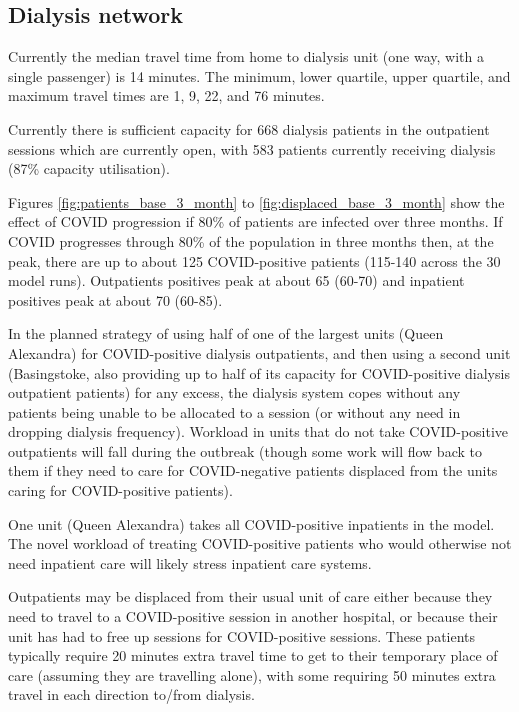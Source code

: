\begin{multicols}{2}
\subsection{Dialysis network}

Currently the median travel time from home to dialysis unit (one way, with a single passenger) is 14 minutes. The minimum, lower quartile, upper quartile, and maximum travel times are 1, 9, 22, and 76 minutes.

Currently there is sufficient capacity for 668 dialysis patients in the outpatient sessions which are currently open, with 583 patients currently receiving dialysis (87\% capacity utilisation).

Figures \ref{fig:patients_base_3_month} to \ref{fig:displaced_base_3_month} show the effect of COVID progression if 80\% of patients are infected over three months. If COVID progresses through 80\% of the population in three months then, at the peak, there are up to about 125 COVID-positive patients (115-140 across the 30 model runs). Outpatients positives peak at about 65 (60-70) and inpatient positives peak at about 70 (60-85).

In the planned strategy of using half of one of the largest units (Queen Alexandra) for COVID-positive dialysis outpatients, and then using a second unit (Basingstoke, also providing up to half of its capacity for COVID-positive dialysis outpatient patients) for any excess, the dialysis system copes without any patients being unable to be allocated to a session (or without any need in dropping dialysis frequency). Workload in units that do not take COVID-positive outpatients will fall during the outbreak (though some work will flow back to them if they need to care for COVID-negative patients displaced from the units caring for COVID-positive patients). 

One unit (Queen Alexandra) takes all COVID-positive inpatients in the model. The novel workload of treating COVID-positive patients who would otherwise not need inpatient care will likely stress inpatient care systems.

Outpatients may be displaced from their usual unit of care either because they need to travel to a COVID-positive session in another hospital, or because their unit has had to free up sessions for COVID-positive sessions. These patients typically require 20 minutes extra travel time to get to their temporary place of care (assuming they are travelling alone), with some requiring 50 minutes extra travel in each direction to/from dialysis. 


\end{multicols}
